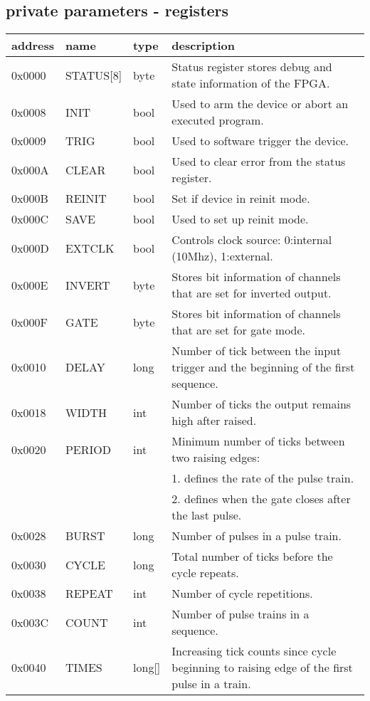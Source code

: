 \documentclass{article}
\begin{document}
\subsection*{private parameters - registers}
\begin{tabular}{llll}
address&name&type&description\\\hline
0x0000&STATUS[8]&byte&Status register stores debug and state information of the FPGA.\\
0x0008&INIT&bool&Used to arm the device or abort an executed program.\\
0x0009&TRIG&bool&Used to software trigger the device.\\
0x000A&CLEAR&bool&Used to clear error from the status register.\\
0x000B&REINIT&bool&Set if device in reinit mode.\\
0x000C&SAVE&bool&Used to set up reinit mode.\\
0x000D&EXTCLK&bool&Controls clock source: 0:internal (10Mhz), 1:external.\\
0x000E&INVERT&byte&Stores bit information of channels that are set for inverted output.\\
0x000F&GATE&byte&Stores bit information of channels that are set for gate mode.\\
0x0010&DELAY&long&Number of tick between the input trigger and the beginning of the first sequence.\\
0x0018&WIDTH&int&Number of ticks the output remains high after raised.\\
0x0020&PERIOD&int&Minimum number of ticks between two raising edges:\\
&&& 1. defines the rate of the pulse train.\\
&&& 2. defines when the gate closes after the last pulse.\\
0x0028&BURST&long&Number of pulses in a pulse train.\\
0x0030&CYCLE&long&Total number of ticks before the cycle repeats.\\
0x0038&REPEAT&int&Number of cycle repetitions.\\
0x003C&COUNT&int&Number of pulse trains in a sequence.\\
0x0040&TIMES&long[]&Increasing tick counts since cycle beginning to raising edge of the first pulse in a train.\\
\end{tabular}
\end{document}
